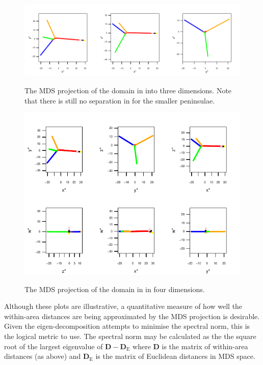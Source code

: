 \begin{figure}
\centering
\includegraphics[width=6in]{mds/figs/comb-3d.pdf} \\
\caption{The MDS projection of the domain in  into three dimensions. Note that there is still no separation in for the smaller peninsulae.}
\label{mds-comb-3d}
\end{figure}

\begin{figure}
\centering
\includegraphics[width=6in]{mds/figs/comb-4d.pdf} \\
\caption{The MDS projection of the domain in  in four dimensions.}
\label{mds-comb-4d}
\end{figure}

Although these plots are illustrative, a quantitative measure of how well the within-area distances are being approximated by the MDS projection is desirable. Given the eigen-decomposition attempts to minimise the spectral norm, this is the logical metric to use. The spectral norm may be calculated as the the square root of the largest eigenvalue of $\mathbf{D}-\mathbf{D}_\text{E}$ where $\mathbf{D}$ is the matrix of within-area distances (as above) and $\mathbf{D}_\text{E}$ is the matrix of Euclidean distances in MDS space.

